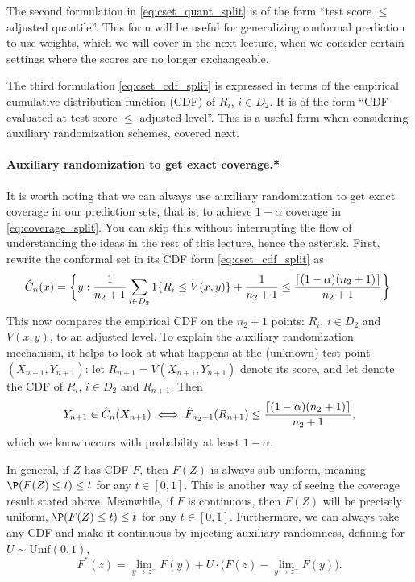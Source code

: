 \documentclass{article}
\begin{document}
The second formulation in \eqref{eq:cset_quant_split} is of the form ``test
score $\leq$ adjusted quantile''. This form will be useful for generalizing
conformal prediction to use weights, which we will cover in the next lecture,
when we consider certain settings where the scores are no longer exchangeable. 

The third formulation \eqref{eq:cset_cdf_split} is expressed in terms of the
empirical cumulative distribution function (CDF) of $R_i$, $i \in D_2$. It is of 
the form ``CDF evaluated at test score $\leq$ adjusted level''. This is a useful
form when considering auxiliary randomization schemes, covered next. 

\paragraph{Auxiliary randomization to get exact coverage.*}  

It is worth noting that we can always use auxiliary randomization to get exact
coverage in our prediction sets, that is, to achieve $1-\alpha$ coverage in
\eqref{eq:coverage_split}. You can skip this without interrupting the flow of
understanding the ideas in the rest of this lecture, hence the asterisk. First,
rewrite the conformal set in its CDF form \eqref{eq:cset_cdf_split} as   
\[
\hat{C}_n(x) = \bigg\{ y : \frac{1}{n_2+1} \sum_{i \in D_2} 1\{ R_i \leq V(x,y) \}
+ \frac{1}{n_2+1} \leq \frac{\lceil (1-\alpha)(n_2+1) \rceil}{n_2+1} \bigg\}.    
\]
This now compares the empirical CDF on the $n_2+1$ points: $R_i$, $i \in D_2$
and $V(x,y)$, to an adjusted level. To explain the auxiliary randomization 
mechanism, it helps to look at what happens at the (unknown) test point 
$(X_{n+1},Y_{n+1})$: let $R_{n+1} = V(X_{n+1},Y_{n+1})$ denote its score, and
let  denote the CDF of $R_i$, $i \in D_2$ and
$R_{n+1}$. Then   
\[
Y_{n+1} \in \hat{C}_n(X_{n+1}) \iff \hat{F}_{n_2+1}(R_{n+1}) \leq \frac{\lceil 
  (1-\alpha)(n_2+1) \rceil}{n_2+1}, 
\]
which we know occurs with probability at least $1-\alpha$.

In general, if $Z$ has CDF $F$, then $F(Z)$ is always sub-uniform, meaning 
$\P( F(Z) \leq t) \leq t$ for any $t \in [0,1]$. This is another way of seeing
the coverage result stated above. Meanwhile, if $F$ is continuous, then $F(Z)$
will be precisely uniform, $\P( F(Z) \leq t) \leq t$ for any $t \in
[0,1]$. Furthermore, we can always take any CDF and make it continuous by
injecting auxiliary randomness, defining for $U \sim \mathrm{Unif}(0,1)$,
\[
F^*(z) = \lim_{y \to z^-} F(y) + U \cdot \Big( F(z) - \lim_{y \to z^-} F(y)
\Big).
\]
\end{document}
